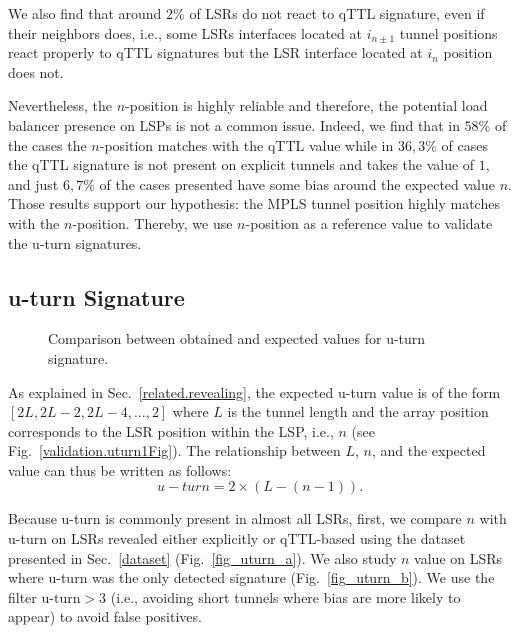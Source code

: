 We also find that around $2\%$ of LSRs do not react to qTTL signature, even if
their neighbors does, i.e., some LSRs interfaces located at $i_{n \pm 1}$
tunnel positions react properly to qTTL signatures but the LSR interface located
at $i_n$ position does not.

Nevertheless, the $n$-position is highly reliable and therefore, the potential
load balancer presence on LSPs is not a common issue. Indeed, we find that in
$58\%$ of the cases the $n$-position matches with the qTTL value while in
$36,3\%$ of cases the qTTL signature is not present on explicit tunnels and
takes the value of $1$, and just $6,7\%$ of the cases presented have some bias
around the expected value $n$. Those results support our hypothesis: the  MPLS
tunnel position highly matches with the $n$-position. Thereby, we use
$n$-position as a reference value to validate the u-turn signatures.

\subsection{u-turn Signature}\label{validation.uturn}
\begin{figure}[!t]
  \begin{center}    
\hspace{-0.3cm}      
  \end{center}
\vspace{-0.5cm}  
  \caption{Comparison between obtained and expected values for u-turn
  signature.}
  \label{validation.uturn.fig}
\end{figure}

As explained in Sec.~\ref{related.revealing},  the expected u-turn value is of
the form $[2L, 2L-2, 2L-4,..., 2]$ where $L$ is the tunnel length and the array
position corresponds to the LSR position within the LSP, i.e., $n$ (see
Fig.~\ref{validation.uturn1Fig}).  The relationship between $L$, $n$, and the
expected value can thus be written as follows:
\begin{equation}
u-turn = 2 \times (L - (n-1)) .
\label{eqn.uturn}
\end{equation}

Because u-turn is commonly present in almost all LSRs, first, we compare $n$
with u-turn on LSRs revealed either explicitly or qTTL-based using the dataset
presented in Sec.~\ref{dataset} (Fig.~\ref{fig_uturn_a}). We also study 
$n$ value on LSRs where u-turn was the only detected signature
(Fig.~\ref{fig_uturn_b}). We use the filter $\text{u-turn}>3$ (i.e., avoiding
short tunnels where bias are more likely to appear) to avoid false positives.

